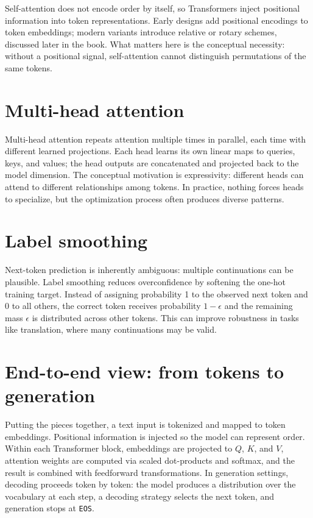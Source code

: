 Self-attention does not encode order by itself, so Transformers inject positional information into token representations. Early designs add positional encodings to token embeddings; modern variants introduce relative or rotary schemes, discussed later in the book. What matters here is the conceptual necessity: without a positional signal, self-attention cannot distinguish permutations of the same tokens.

\section{Multi-head attention}
Multi-head attention repeats attention multiple times in parallel, each time with different learned projections. Each head learns its own linear maps to queries, keys, and values; the head outputs are concatenated and projected back to the model dimension. The conceptual motivation is expressivity: different heads can attend to different relationships among tokens. In practice, nothing forces heads to specialize, but the optimization process often produces diverse patterns.

\section{Label smoothing}
Next-token prediction is inherently ambiguous: multiple continuations can be plausible. Label smoothing reduces overconfidence by softening the one-hot training target. Instead of assigning probability 1 to the observed next token and 0 to all others, the correct token receives probability $1-\epsilon$ and the remaining mass $\epsilon$ is distributed across other tokens. This can improve robustness in tasks like translation, where many continuations may be valid.

\section{End-to-end view: from tokens to generation}
Putting the pieces together, a text input is tokenized and mapped to token embeddings. Positional information is injected so the model can represent order. Within each Transformer block, embeddings are projected to $Q$, $K$, and $V$, attention weights are computed via scaled dot-products and softmax, and the result is combined with feedforward transformations. In generation settings, decoding proceeds token by token: the model produces a distribution over the vocabulary at each step, a decoding strategy selects the next token, and generation stops at \texttt{EOS}.

